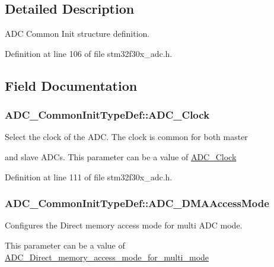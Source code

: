 \subsection{Detailed Description}
A\-D\-C Common Init structure definition. 

Definition at line 106 of file stm32f30x\-\_\-adc.\-h.



\subsection{Field Documentation}
\hypertarget{struct_a_d_c___common_init_type_def_ac1eb26eb45868dd0e85fbd65944f5275}{
\subsubsection[{A\-D\-C\-\_\-\-Clock}]{ A\-D\-C\-\_\-\-Common\-Init\-Type\-Def\-::\-A\-D\-C\-\_\-\-Clock}}\label{struct_a_d_c___common_init_type_def_ac1eb26eb45868dd0e85fbd65944f5275}
\begin{DoxyVerb}                    Select the clock of the ADC. The clock is common for both master 
\end{DoxyVerb}
 and slave A\-D\-Cs. This parameter can be a value of \hyperlink{group___a_d_c___clock}{A\-D\-C\-\_\-\-Clock} 

Definition at line 111 of file stm32f30x\-\_\-adc.\-h.

\hypertarget{struct_a_d_c___common_init_type_def_a421063e29be85798195ea5f2e6c26fbd}{
\subsubsection[{A\-D\-C\-\_\-\-D\-M\-A\-Access\-Mode}]{ A\-D\-C\-\_\-\-Common\-Init\-Type\-Def\-::\-A\-D\-C\-\_\-\-D\-M\-A\-Access\-Mode}}\label{struct_a_d_c___common_init_type_def_a421063e29be85798195ea5f2e6c26fbd}
\begin{DoxyVerb}             Configures the Direct memory access mode for multi ADC mode.                                               
\end{DoxyVerb}
 This parameter can be a value of \hyperlink{group___a_d_c___direct__memory__access__mode__for__multi__mode}{A\-D\-C\-\_\-\-Direct\-\_\-memory\-\_\-access\-\_\-mode\-\_\-for\-\_\-multi\-\_\-mode}

